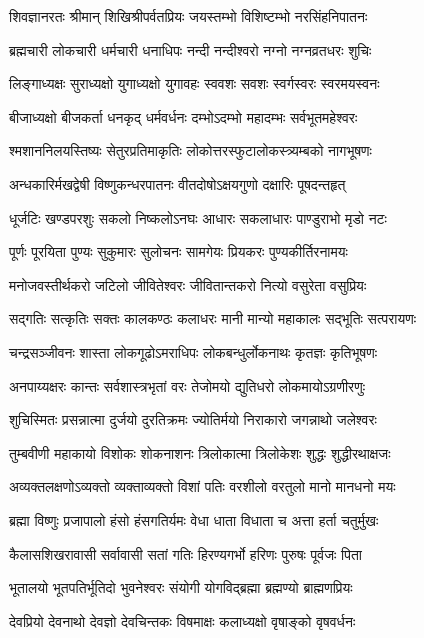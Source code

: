 \twolineshloka
{शिवज्ञानरतः श्रीमान् शिखिश्रीपर्वतप्रियः}
{जयस्तम्भो विशिष्टम्भो नरसिंहनिपातनः}

\twolineshloka
{ब्रह्मचारी लोकचारी धर्मचारी धनाधिपः}
{नन्दी नन्दीश्वरो नग्नो नग्नव्रतधरः शुचिः}

\twolineshloka
{लिङ्गाध्यक्षः सुराध्यक्षो युगाध्यक्षो युगावहः}
{स्ववशः सवशः स्वर्गस्वरः स्वरमयस्वनः}

\twolineshloka
{बीजाध्यक्षो बीजकर्ता धनकृद् धर्मवर्धनः}
{दम्भोऽदम्भो महादम्भः सर्वभूतमहेश्वरः}

\twolineshloka
{श्मशाननिलयस्तिष्यः सेतुरप्रतिमाकृतिः}
{लोकोत्तरस्फुटालोकस्त्र्यम्बको नागभूषणः}

\twolineshloka
{अन्धकारिर्मखद्वेषी विष्णुकन्धरपातनः}
{वीतदोषोऽक्षयगुणो दक्षारिः पूषदन्तहृत्}

\twolineshloka
{धूर्जटिः खण्डपरशुः सकलो निष्कलोऽनघः}
{आधारः सकलाधारः पाण्डुराभो मृडो नटः}

\twolineshloka
{पूर्णः पूरयिता पुण्यः सुकुमारः सुलोचनः}
{सामगेयः प्रियकरः पुण्यकीर्तिरनामयः}

\twolineshloka
{मनोजवस्तीर्थकरो जटिलो जीवितेश्वरः}
{जीवितान्तकरो नित्यो वसुरेता वसुप्रियः}

\twolineshloka
{सद्गतिः सत्कृतिः सक्तः कालकण्ठः कलाधरः}
{मानी मान्यो महाकालः सद्भूतिः सत्परायणः}

\twolineshloka
{चन्द्रसञ्जीवनः शास्ता लोकगूढोऽमराधिपः}
{लोकबन्धुर्लोकनाथः कृतज्ञः कृतिभूषणः}

\twolineshloka
{अनपाय्यक्षरः कान्तः सर्वशास्त्रभृतां वरः}
{तेजोमयो द्युतिधरो लोकमायोऽग्रणीरणुः}

\twolineshloka
{शुचिस्मितः प्रसन्नात्मा दुर्जयो दुरतिक्रमः}
{ज्योतिर्मयो निराकारो जगन्नाथो जलेश्वरः}

\twolineshloka
{तुम्बवीणी महाकायो विशोकः शोकनाशनः}
{त्रिलोकात्मा त्रिलोकेशः शुद्धः शुद्धीरथाक्षजः}

\twolineshloka
{अव्यक्तलक्षणोऽव्यक्तो व्यक्ताव्यक्तो विशां पतिः}
{वरशीलो वरतुलो मानो मानधनो मयः}

\twolineshloka
{ब्रह्मा विष्णुः प्रजापालो हंसो हंसगतिर्यमः}
{वेधा धाता विधाता च अत्ता हर्ता चतुर्मुखः}

\twolineshloka
{कैलासशिखरावासी सर्वावासी सतां गतिः}
{हिरण्यगर्भो हरिणः पुरुषः पूर्वजः पिता}

\twolineshloka
{भूतालयो भूतपतिर्भूतिदो भुवनेश्वरः}
{संयोगी योगविद्ब्रह्मा ब्रह्मण्यो ब्राह्मणप्रियः}

\twolineshloka
{देवप्रियो देवनाथो देवज्ञो देवचिन्तकः}
{विषमाक्षः कलाध्यक्षो वृषाङ्को वृषवर्धनः}


